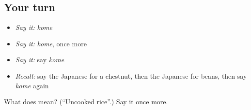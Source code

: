 \subsection*{Your turn}
\begin{itemize}
\raggedright
  \item \emph{Say it:} \emph{kome}
  \item \emph{Say it:} \emph{kome}, once more
  \item \emph{Say it:} say \emph{kome}
  \item \emph{Recall:} say the Japanese for a chestnut, then the Japanese for beans, then say \emph{kome} again
\end{itemize}

\begin{tcolorbox}[breakable,colback=teal!4,colframe=teal!35!black,title={Before you move on}]
What does  mean? (\textquotedblleft{}Uncooked rice\textquotedblright{}.) Say it once more.
\end{tcolorbox}
